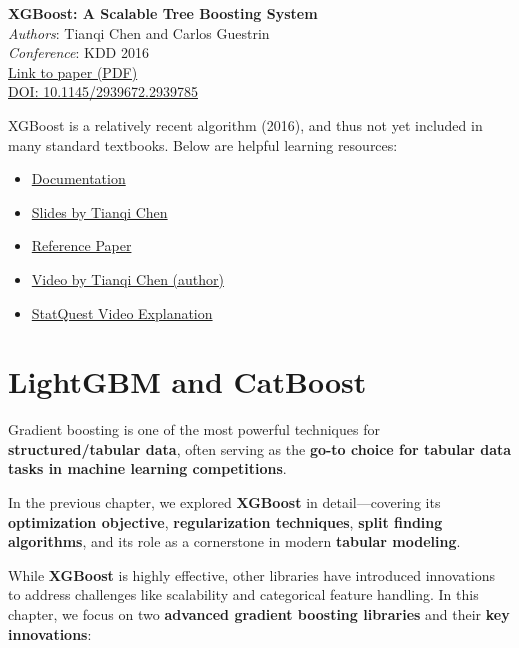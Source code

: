\documentclass[
  letterpaper,
  DIV=11,
  numbers=noendperiod]{scrreprt}
\providecommand{\tightlist}{%
  \setlength{\itemsep}{0pt}\setlength{\parskip}{0pt}}\usepackage{longtable,booktabs,array}
\begin{document}
\textbf{XGBoost: A Scalable Tree Boosting System}\\
\emph{Authors}: Tianqi Chen and Carlos Guestrin\\
\emph{Conference}: KDD 2016\\
\href{https://arxiv.org/abs/1603.02754}{Link to paper (PDF)}\\
\href{https://doi.org/10.1145/2939672.2939785}{DOI:
10.1145/2939672.2939785}

XGBoost is a relatively recent algorithm (2016), and thus not yet
included in many standard textbooks. Below are helpful learning
resources:

\begin{itemize}
\tightlist
\item
  \href{https://xgboost.readthedocs.io/en/stable/python/python_api.html}{Documentation}
\item
  \href{https://files.speakerdeck.com/presentations/5c6dab45648344208185d2b1ab4fdc95/XGBoost-Newest.pdf}{Slides
  by Tianqi Chen}
\item
  \href{https://dl.acm.org/doi/pdf/10.1145/2939672.2939785}{Reference
  Paper}
\item
  \href{https://www.youtube.com/watch?v=Vly8xGnNiWs}{Video by Tianqi
  Chen (author)}
\item
  \href{https://www.youtube.com/watch?v=OtD8wVaFm6E}{StatQuest Video
  Explanation}
\end{itemize}

\chapter{LightGBM and CatBoost}\label{lightgbm-and-catboost}

Gradient boosting is one of the most powerful techniques for
\textbf{structured/tabular data}, often serving as the \textbf{go-to
choice for tabular data tasks in machine learning competitions}.

In the previous chapter, we explored \textbf{XGBoost} in
detail---covering its \textbf{optimization objective},
\textbf{regularization techniques}, \textbf{split finding algorithms},
and its role as a cornerstone in modern \textbf{tabular modeling}.

While \textbf{XGBoost} is highly effective, other libraries have
introduced innovations to address challenges like scalability and
categorical feature handling. In this chapter, we focus on two
\textbf{advanced gradient boosting libraries} and their \textbf{key
innovations}:
\end{document}

